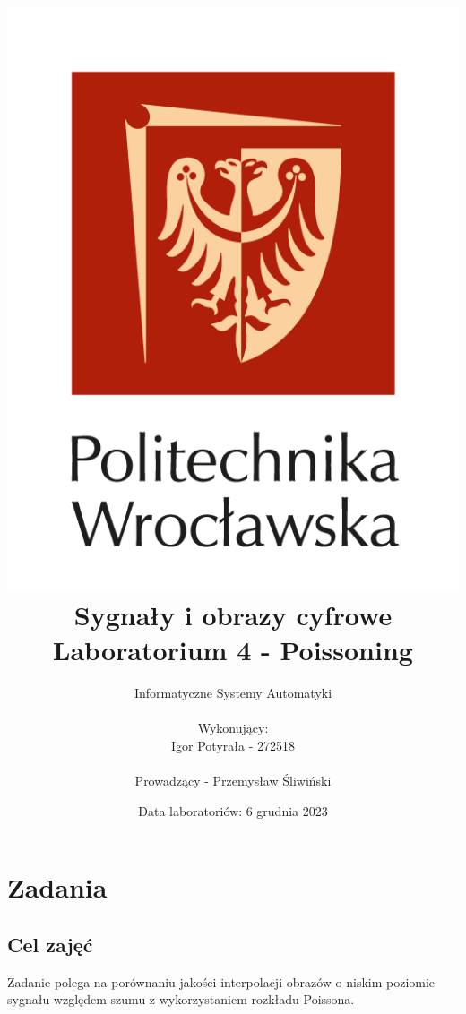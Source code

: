 \documentclass[14pt]{article}
\title{
    \includegraphics[scale=0.5]{images/logo-pwr-pion.png}
    \vspace{1cm}
    \\
    {\textbf{
    \titlefont Sygnały i obrazy cyfrowe
    \\ Laboratorium 4 - Poissoning
    }}
}
\author{
    Informatyczne Systemy Automatyki
    \\
    \\ Wykonujący:
    \\ Igor Potyrała - 272518
    \\
    \\ Prowadzący - Przemysław Śliwiński
}
\date{Data laboratoriów: 6 grudnia 2023}
\begin{document}
\maketitle
\newpage

\section{Zadania}
\subsection{Cel zajęć}
Zadanie polega na porównaniu jakości 
interpolacji obrazów o niskim poziomie 
sygnału względem szumu z wykorzystaniem 
rozkładu Poissona.
\end{document}
